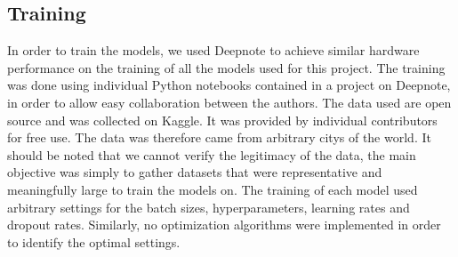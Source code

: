 \subsection{Training}
In order to train the models, we used Deepnote\cite{deepnote} to achieve similar hardware performance on the training of all the models used for this project. 
The training was done using individual Python notebooks contained in a project on Deepnote, in order to allow easy collaboration between the authors.
The data used are open source and was collected on Kaggle\cite{kaggle}. It was provided by individual contributors for free use.
The data was therefore came from arbitrary citys of the world. 
It should be noted that we cannot verify the legitimacy of the data, the main objective was simply to gather datasets that were representative and meaningfully large to train the models on. 
The training of each model used arbitrary settings for the batch sizes, hyperparameters, learning rates and dropout rates. Similarly, no optimization algorithms were implemented in order to identify the optimal settings. 